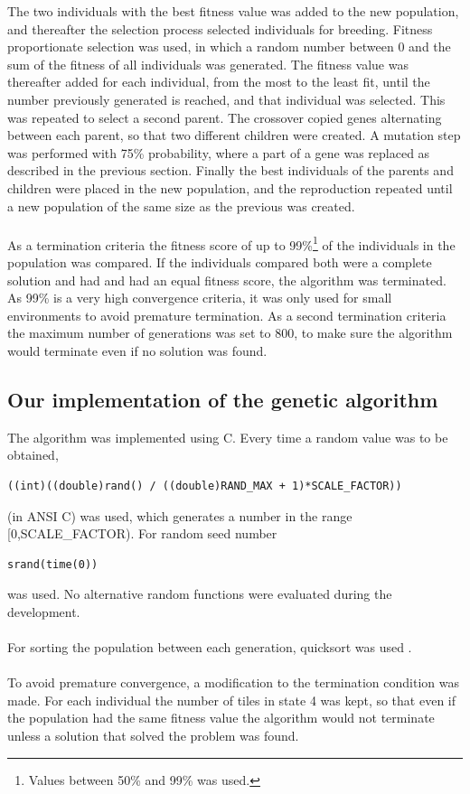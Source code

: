 The two individuals with the best fitness value was added to the new population, and thereafter the selection process selected individuals for breeding. Fitness proportionate selection was used, in which a random number between 0 and the sum of the fitness of all individuals was generated. The fitness value was thereafter added for each individual, from the most to the least fit, until the number previously generated is reached, and that individual was selected. This was repeated to select a second parent. The crossover copied genes alternating between each parent, so that two different children were created. A mutation step was performed with 75\% probability, where a part of a gene was replaced as described in the previous section. Finally the best individuals of the parents and children were  placed in the new population, and the reproduction repeated until a new population of the same size as the previous was created.\\\\
As a termination criteria the fitness score of up to 99\%\footnote{Values between 50\% and 99\% was used.} of the individuals in the population was compared. If the individuals compared both were a complete solution and had and had an equal fitness score, the algorithm was terminated. As 99\% is a very high convergence criteria, it was only used for small environments to avoid premature termination. As a second termination criteria the maximum number of generations was set to 800, to make sure the algorithm would terminate even if no solution was found.
\subsection{Our implementation of the genetic algorithm}
The algorithm was implemented using C. Every time a random value was to be obtained,
\begin{verbatim}
((int)((double)rand() / ((double)RAND_MAX + 1)*SCALE_FACTOR))
\end{verbatim}
(in ANSI C) was used, which generates a number in the range [0,SCALE\_FACTOR). For random seed number 
\begin{verbatim}
srand(time(0))
\end{verbatim}
was used. No alternative random functions were evaluated during the development.\\\\
For sorting the population between each generation, quicksort was used \cite{quicksort}.\\\\
To avoid premature convergence, a modification to the termination condition was made. For each individual the number of tiles in state 4 was kept, so that even if the population had the same fitness value the algorithm would not terminate unless a solution that solved the problem was found.
\newpage